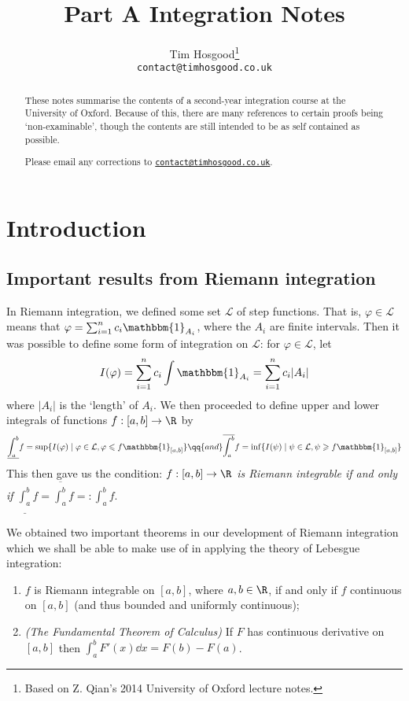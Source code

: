 \documentclass{maths}
\author{Tim Hosgood\thanks{Based on Z. Qian's 2014 University of Oxford lecture notes.}\\\texttt{contact@timhosgood.co.uk}}
\title{Part A Integration Notes}
\newcommand{\ind}{\mathbbm{1}}
\begin{document}
\maketitle

\begin{abstract}
    These notes summarise the contents of a second-year integration course at the University of Oxford.
    Because of this, there are many references to certain proofs being `non-examinable', though the contents are still intended to be as self contained as possible.

    Please email any corrections to \href{mailto:contact@timhosgood.co.uk}{\texttt{contact@timhosgood.co.uk}}.
\end{abstract}

\tableofcontents

\section{Introduction}


\subsection{Important results from Riemann integration}

In Riemann integration, we defined some set $\mathcal{L}$ of step functions.
That is, $\varphi\in\mathcal{L}$ means that $\varphi=\sum_{i=1}^n c_i\ind_{A_i}$, where the $A_i$ are finite intervals.
Then it was possible to define some form of integration on $\mathcal{L}$: for $\varphi\in\mathcal{L}$, let
\[
    I(\varphi)=
    \sum_{i=1}^n c_i\int\ind_{A_i}=
    \sum_{i=1}^n c_i |A_i|
\]
where $|A_i|$ is the `length' of $A_i$.
We then proceeded to define upper and lower integrals of functions $f:[a,b]\to\R$ by
\[
    \underline{\int_a^b} f=
    \sup\{I(\varphi)\mid \varphi\in\mathcal{L}, \varphi\leqslant f\ind_{[a,b]}\}
    \qq{and}
    \overline{\int_a^b} f=
    \inf\{I(\psi)\mid \psi\in\mathcal{L}, \psi\geqslant f\ind_{[a,b]}\}
\]
This then gave us the condition: \emph{$f:[a,b]\to\R$ is Riemann integrable if and only if $\underline{\int_a^b}f=\overline{\int_a^b}f=:\int_a^b f$}.

We obtained two important theorems in our development of Riemann integration which we shall be able to make use of in applying the theory of Lebesgue integration:
\begin{enumerate}
    \item $f$ is Riemann integrable on $[a,b]$, where $a,b\in\R$, if and only if $f$ continuous on $[a,b]$ (and thus bounded and uniformly continuous);
    \item \emph{(The Fundamental Theorem of Calculus)} If $F$ has continuous derivative on $[a,b]$ then $\int_a^b F'(x)\dd{x}=F(b)-F(a)$.
\end{enumerate}
\end{document}
